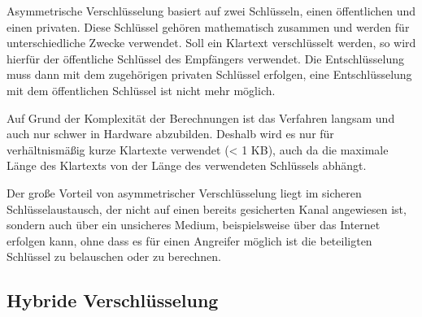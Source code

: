 
Asymmetrische Verschlüsselung basiert auf zwei Schlüsseln, einen öffentlichen und einen privaten. Diese Schlüssel gehören mathematisch zusammen und werden für unterschiedliche Zwecke verwendet.
Soll ein Klartext verschlüsselt werden, so wird hierfür der öffentliche Schlüssel des Empfängers verwendet. Die Entschlüsselung muss dann mit dem zugehörigen privaten Schlüssel erfolgen, eine Entschlüsselung mit dem öffentlichen Schlüssel ist nicht mehr möglich.

Auf Grund der Komplexität der Berechnungen ist das Verfahren langsam und auch nur schwer in Hardware abzubilden. Deshalb wird es nur für verhältnismäßig kurze Klartexte verwendet (< 1 KB), auch da die maximale Länge des Klartexts von der Länge des verwendeten Schlüssels abhängt. %


Der große Vorteil von asymmetrischer Verschlüsselung liegt im sicheren Schlüsselaustausch, der nicht auf einen bereits gesicherten Kanal angewiesen ist, sondern auch über ein unsicheres Medium, beispielsweise über das Internet erfolgen kann, ohne dass es für einen Angreifer möglich ist die beteiligten Schlüssel zu belauschen oder zu berechnen. %




\subsection{Hybride Verschlüsselung}
\label{sec:hybride_verschl}

